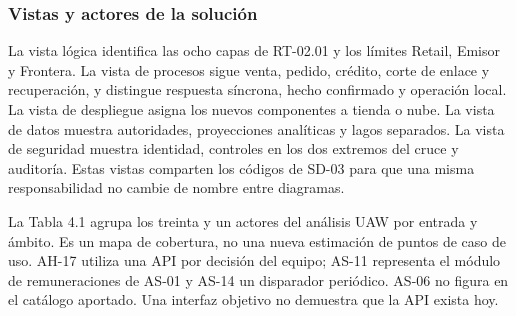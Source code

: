\documentclass[11pt]{article}
\begin{document}
\subsubsection{Vistas y actores de la solución}

La vista lógica identifica las ocho capas de RT-02.01 y los límites Retail, Emisor y Frontera. La vista de procesos sigue venta, pedido, crédito, corte de enlace y recuperación, y distingue respuesta síncrona, hecho confirmado y operación local. La vista de despliegue asigna los nuevos componentes a tienda o nube. La vista de datos muestra autoridades, proyecciones analíticas y lagos separados. La vista de seguridad muestra identidad, controles en los dos extremos del cruce y auditoría. Estas vistas comparten los códigos de SD-03 para que una misma responsabilidad no cambie de nombre entre diagramas.

La Tabla 4.1 agrupa los treinta y un actores del análisis UAW por entrada y ámbito. Es un mapa de cobertura, no una nueva estimación de puntos de caso de uso. AH-17 utiliza una API por decisión del equipo; AS-11 representa el módulo de remuneraciones de AS-01 y AS-14 un disparador periódico. AS-06 no figura en el catálogo aportado. Una interfaz objetivo no demuestra que la API exista hoy.

\par\vspace{0pt plus 10\baselineskip}\vspace{0pt plus -10\baselineskip}
\end{document}
